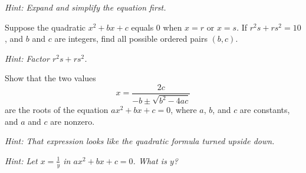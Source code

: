 \documentclass[12pt]{exam}
\begin{document}
\begin{questions}
\textit{Hint: Expand and simplify the equation first.}
\vspace*{5cm}

\question[10]
Suppose the quadratic $x^2 + bx + c$ equals 0 when $x = r$ or $x = s$. If $r^2s + rs^2 = 10$, and $b$ and $c$ are integers, find all possible ordered pairs $(b, c)$.

\textit{Hint: Factor $r^2s + rs^2$.}
\vspace*{5cm}

\newpage

\question[12]
Show that the two values
$$x = \frac{2c}{-b \pm \sqrt{b^2 - 4ac}}$$
are the roots of the equation $ax^2 + bx + c = 0$, where $a$, $b$, and $c$ are constants, and $a$ and $c$ are nonzero.

\textit{Hint: That expression looks like the quadratic formula turned upside down.}

\textit{Hint: Let $x = \frac{1}{y}$ in $ax^2 + bx + c = 0$. What is $y$?}
\vspace*{6cm}

\end{questions}
\end{document}
